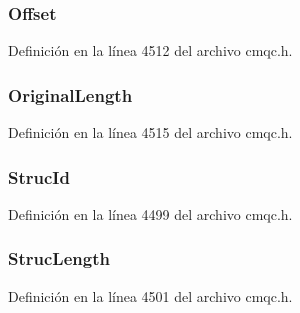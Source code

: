 \subsubsection[{Offset}]{ Offset}\label{structtag_m_q_m_d_e_aac8433c970f16a602e3b79400e87d28b}


Definición en la línea 4512 del archivo cmqc.\+h.

\hypertarget{structtag_m_q_m_d_e_acf39c0c6d2618f565cf8315c8775b5ae}{}
\subsubsection[{Original\+Length}]{ Original\+Length}\label{structtag_m_q_m_d_e_acf39c0c6d2618f565cf8315c8775b5ae}


Definición en la línea 4515 del archivo cmqc.\+h.

\hypertarget{structtag_m_q_m_d_e_a0530922ca944569b52601d74941f96e4}{}
\subsubsection[{Struc\+Id}]{ Struc\+Id}\label{structtag_m_q_m_d_e_a0530922ca944569b52601d74941f96e4}


Definición en la línea 4499 del archivo cmqc.\+h.

\hypertarget{structtag_m_q_m_d_e_a830af9a4a08c015b9a4b2d39d4d3420a}{}
\subsubsection[{Struc\+Length}]{ Struc\+Length}\label{structtag_m_q_m_d_e_a830af9a4a08c015b9a4b2d39d4d3420a}


Definición en la línea 4501 del archivo cmqc.\+h.

\hypertarget{structtag_m_q_m_d_e_a0656ef8f766b3907d394d88a35d7b7e9}{}
